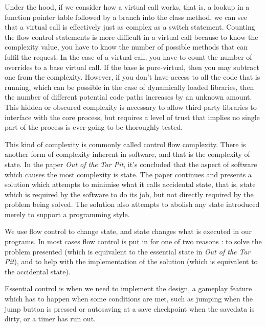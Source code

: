 \documentclass[a4paper,12pt]{article}
\begin{document}
Under the hood, if we consider how a virtual call works, that is, a lookup in a function pointer table followed by a branch into the class method, we can see that a virtual call is effectively just as complex as a switch statement.
Counting the flow control statements is more difficult in a virtual call because to know the complexity value, you have to know the number of possible methods that can fulfil the request.
In the case of a virtual call, you have to count the number of overrides to a base virtual call.
If the base is pure-virtual, then you may subtract one from the complexity.
However, if you don't have access to all the code that is running, which can be possible in the case of dynamically loaded libraries, then the number of different potential code paths increases by an unknown amount.
This hidden or obscured complexity is necessary to allow third party libraries to interface with the core process, but requires a level of trust that implies no single part of the process is ever going to be thoroughly tested.

This kind of complexity is commonly called control flow complexity.
There is another form of complexity inherent in software, and that is the complexity of state.
In the paper \textit{Out of the Tar Pit}, it's concluded that the aspect of software which causes the most complexity is state.
The paper continues and presents a solution which attempts to minimise what it calls accidental state, that is, state which is required by the software to do its job, but not directly required by the problem being solved.
The solution also attempts to abolish any state introduced merely to support a programming style.

We use flow control to change state, and state changes what is executed in our programs.
In most cases flow control is put in for one of two reasons :
to solve the problem presented (which is equivalent to the essential state in \textit{Out of the Tar Pit}), and to help with the implementation of the solution (which is equivalent to the accidental state).

Essential control is when we need to implement the design, a gameplay feature which has to happen when some conditions are met, such as jumping when the jump button is pressed or autosaving at a save checkpoint when the savedata is dirty, or a timer has run out.
\end{document}
